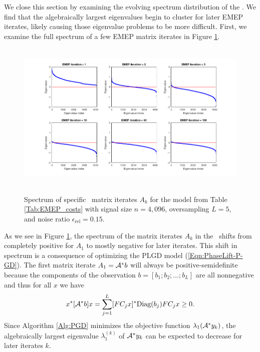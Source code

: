 We close this section by examining the evolving spectrum distribution of the \emep.
We find that the algebraically largest eigenvalues begin to cluster for  later EMEP iterates, likely causing those eigenvalue problems to be more difficult.
First, we examine the full spectrum of a few EMEP matrix iterates in Figure \ref{Fig:EMEP_full_spectrum}.




\begin{figure}[H]
\centering
\hbox{\hspace{-1.9cm} \includegraphics[scale=0.6]{EMEP_full_spectrum} }\vspace{-0.4cm}
	\caption{Spectrum of specific \emep \ matrix iterates $A_k$ for the model from Table \ref{Tab:EMEP_costs} with signal size $n = 4,096$, oversampling $L = 5$, and noise ratio $\epsilon_\text{rel} = 0.15$.}
\label{Fig:EMEP_full_spectrum}
\end{figure}

As we see in Figure \ref{Fig:EMEP_full_spectrum}, the spectrum of the matrix iterates $A_k$ in the \emep \ shifts from completely positive for $A_1$ to mostly negative for later iterates.  This shift in spectrum is a consequence of optimizing the PLGD model (\ref{Eqn:PhaseLift-P-GD}).  The first matrix iterate $A_1 = {\mathcal A}^*b$ will always be positive-semidefinite because the components of the observation $b=[b_1; b_2; \ldots; b_L]$ are all nonnegative and thus for all $x$ we have 
\[
x^*[{\mathcal A}^*b]x 
	= \sum\limits_{\substack{j=1}}^{\substack{L}}
		[FC_jx]^* \textnormal{Diag}(b_j) F C_jx
	\geq 0.
\]
Since Algorithm \ref{Alg:PGD} minimizes the objective function $\lambda_1({\mathcal A}^*y_k)$, the algebraically largest eigenvalue $\lambda_1^{(k)}$ of ${\mathcal A}^*y_k$ can be expected to decrease for later iterates $k$.  


